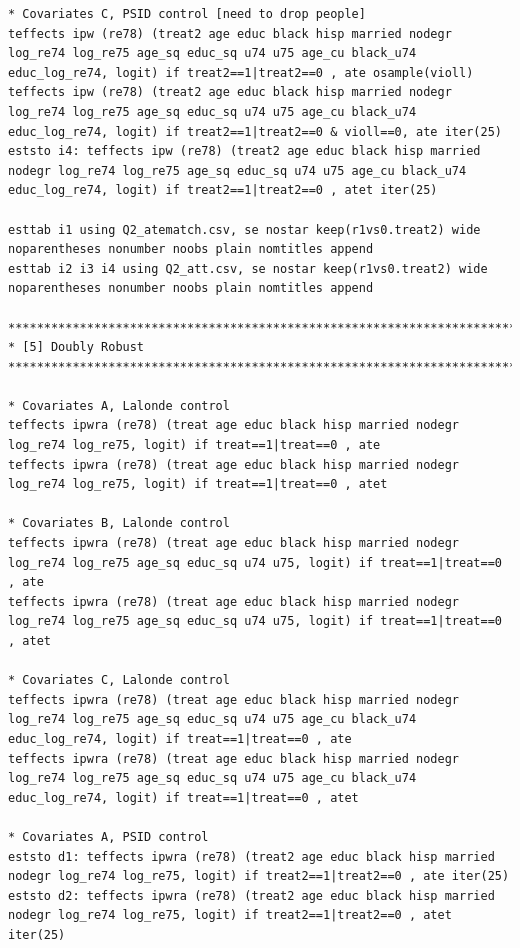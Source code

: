 \documentclass[12pt]{article}
\begin{document}
\begin{verbatim}
* Covariates C, PSID control [need to drop people]
teffects ipw (re78) (treat2 age educ black hisp married nodegr log_re74 log_re75 age_sq educ_sq u74 u75 age_cu black_u74 educ_log_re74, logit) if treat2==1|treat2==0 , ate osample(violl)
teffects ipw (re78) (treat2 age educ black hisp married nodegr log_re74 log_re75 age_sq educ_sq u74 u75 age_cu black_u74 educ_log_re74, logit) if treat2==1|treat2==0 & violl==0, ate iter(25)
eststo i4: teffects ipw (re78) (treat2 age educ black hisp married nodegr log_re74 log_re75 age_sq educ_sq u74 u75 age_cu black_u74 educ_log_re74, logit) if treat2==1|treat2==0 , atet iter(25) 

esttab i1 using Q2_atematch.csv, se nostar keep(r1vs0.treat2) wide noparentheses nonumber noobs plain nomtitles append
esttab i2 i3 i4 using Q2_att.csv, se nostar keep(r1vs0.treat2) wide noparentheses nonumber noobs plain nomtitles append

********************************************************************************
* [5] Doubly Robust
********************************************************************************

* Covariates A, Lalonde control
teffects ipwra (re78) (treat age educ black hisp married nodegr log_re74 log_re75, logit) if treat==1|treat==0 , ate 
teffects ipwra (re78) (treat age educ black hisp married nodegr log_re74 log_re75, logit) if treat==1|treat==0 , atet 

* Covariates B, Lalonde control
teffects ipwra (re78) (treat age educ black hisp married nodegr log_re74 log_re75 age_sq educ_sq u74 u75, logit) if treat==1|treat==0 , ate 
teffects ipwra (re78) (treat age educ black hisp married nodegr log_re74 log_re75 age_sq educ_sq u74 u75, logit) if treat==1|treat==0 , atet

* Covariates C, Lalonde control
teffects ipwra (re78) (treat age educ black hisp married nodegr log_re74 log_re75 age_sq educ_sq u74 u75 age_cu black_u74 educ_log_re74, logit) if treat==1|treat==0 , ate 
teffects ipwra (re78) (treat age educ black hisp married nodegr log_re74 log_re75 age_sq educ_sq u74 u75 age_cu black_u74 educ_log_re74, logit) if treat==1|treat==0 , atet 

* Covariates A, PSID control
eststo d1: teffects ipwra (re78) (treat2 age educ black hisp married nodegr log_re74 log_re75, logit) if treat2==1|treat2==0 , ate iter(25)
eststo d2: teffects ipwra (re78) (treat2 age educ black hisp married nodegr log_re74 log_re75, logit) if treat2==1|treat2==0 , atet iter(25)


\end{verbatim}
\end{document}
